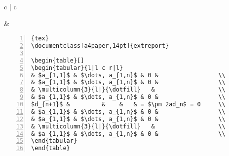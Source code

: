 \begin{tabular}{c | c}

\begin{minipage}[m]{0.4\textwidth}

\end{minipage}
&
\begin{minipage}[m]{0.55\textwidth}
\begin{lstlisting}[numberstyle=\zebra{green!15}{yellow!15},numbers=left,basicstyle=\footnotesize]{tex}
\documentclass[a4paper,14pt]{extreport}

\begin{table}[]
\begin{tabular}{l|l c r|l}
& $a_{1,1}$ & $\dots, a_{1,n}$ & 0 &                 \\  
& $a_{1,1}$ & $\dots, a_{1,n}$ & 0 &                 \\ 
& \multicolumn{3}{l|}{\dotfill}   &                  \\  
& $a_{1,1}$ & $\dots, a_{1,n}$ & 0 &                 \\ 
$d_{n+1}$ &         &    &   & = $\pm 2ad_n$ = 0     \\  
& $a_{1,1}$ & $\dots, a_{1,n}$ & 0 &                 \\  
& $a_{1,1}$ & $\dots, a_{1,n}$ & 0 &                 \\ 
& \multicolumn{3}{l|}{\dotfill}   &                  \\ 
& $a_{1,1}$ & $\dots, a_{1,n}$ & 0 &                 \\ 
\end{tabular}
\end{table}

\end{lstlisting}
\end{minipage}
\end{tabular}

